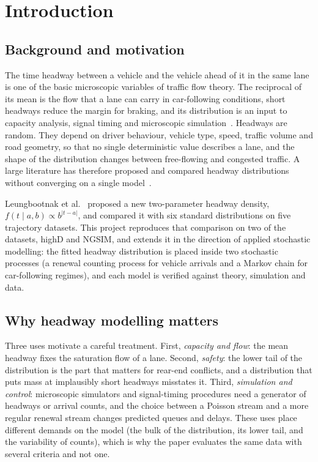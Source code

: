 \documentclass[11pt,a4paper]{article}
\numberwithin{equation}{section}
\begin{document}
\section{Introduction}\label{sec:intro}

\subsection{Background and motivation}
The time headway between a vehicle and the vehicle ahead of it in the same lane is one of the basic microscopic
variables of traffic flow theory. The reciprocal of its mean is the flow that a lane can carry in car-following
conditions, short headways reduce the margin for braking, and its distribution is an input to capacity analysis, signal
timing and microscopic simulation~\cite{li2017survey,may1990,treiber2013}. Headways are random. They depend on driver behaviour,
vehicle type, speed, traffic volume and road geometry, so that no single deterministic value describes a lane, and the
shape of the distribution changes between free-flowing and congested traffic. A large literature has therefore proposed
and compared headway distributions without converging on a single model~\cite{li2017survey,leungbootnak}.

Leungbootnak et al.~\cite{leungbootnak} proposed a new two-parameter headway density, $f(t\mid a,b)\propto b^{|t-a|}$,
and compared it with six standard distributions on five trajectory datasets. This project reproduces that comparison on
two of the datasets, highD and NGSIM, and extends it in the direction of applied stochastic modelling: the
fitted headway distribution is placed inside two stochastic processes (a renewal counting process for vehicle arrivals
and a Markov chain for car-following regimes), and each model is verified against theory, simulation and data.

\subsection{Why headway modelling matters}
Three uses motivate a careful treatment. First, \emph{capacity and flow}: the mean headway fixes the saturation flow of a lane.
Second, \emph{safety}: the lower tail of the distribution is the part that matters for rear-end conflicts, and a distribution that
puts mass at implausibly short headways misstates it. Third, \emph{simulation and control}: microscopic simulators and
signal-timing procedures need a generator of headways or arrival counts, and the choice between a Poisson stream and a more regular renewal stream
changes predicted queues and delays. These uses place different demands on the model (the bulk of the distribution, its lower tail, and the variability of counts), which is why the
paper evaluates the same data with several criteria and not one.
\end{document}
